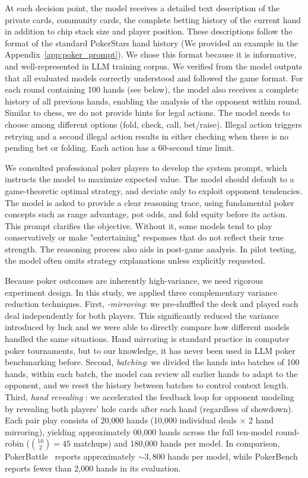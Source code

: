 \documentclass{article}
\begin{document}
At each decision point, the model receives a detailed text description of the private cards, community cards, the complete betting history of the current hand in addition to chip stack size and player position. These descriptions follow the format of the standard PokerStars hand history (We provided an example in the Appendix~\ref{app:poker_prompt}). We chose this format because it is informative, and well-represented in LLM training corpus. We verified from the model outputs that all evaluated models correctly understood and followed the game format. For each round containing 100 hands (see below), the model also receives a complete history of all previous hands, enabling the analysis of the opponent within round. Similar to chess, we do not provide hints for legal actions. The model needs to choose among different options (fold, check, call, bet/raise). Illegal action triggers retrying and a second illegal action results in either checking when there is no pending bet or folding. Each action has a 60-second time limit.

We consulted professional poker players to develop the system prompt, which instructs the model to maximize expected value. The model should default to a game-theoretic optimal strategy, and deviate only to exploit opponent tendencies. The model is asked to provide a clear reasoning trace, using fundamental poker concepts such as range advantage, pot odds, and fold equity before its action. This prompt clarifies the objective. Without it, some models tend to play conservatively or make "entertaining" responses that do not reflect their true strength. The reasoning process also aids in post-game analysis. In pilot testing, the model often omits strategy explanations unless explicitly requested.

Because poker outcomes are inherently high-variance, we need rigorous experiment design. In this study, we applied three complementary variance reduction techniques. First, \emph{-mirroring}: we pre-shuffled the deck and played each deal independently for both players. This significantly reduced the variance introduced by luck and we were able to directly compare how different models handled the same situations. Hand mirroring is standard practice in computer poker tournaments, but to our knowledge, it has never been used in LLM poker benchmarking before. Second, \emph{batching}: we divided the hands into batches of 100 hands, within each batch, the model can review all earlier hands to adapt to the opponent, and we reset the history between batches to control context length. Third, \emph{hand revealing} : we accelerated the feedback loop for opponent modeling by revealing both players' hole cards after each hand (regardless of showdown). Each pair play consists of 20{,}000 hands (10{,}000 individual deals $\times$ 2 hand mirroring), yielding approximately 00{,}000 hands across the full ten-model round-robin ($\binom{10}{2}=45$ matchups) and 180{,}000 hands per model. In comparison, PokerBattle~\citep{pavlov2025pokerbattle} reports approximately ${\sim}3{,}800$ hands per model, while PokerBench~\citep{zhuang2025pokerbench} reports fewer than 2{,}000 hands in its evaluation.
\end{document}
